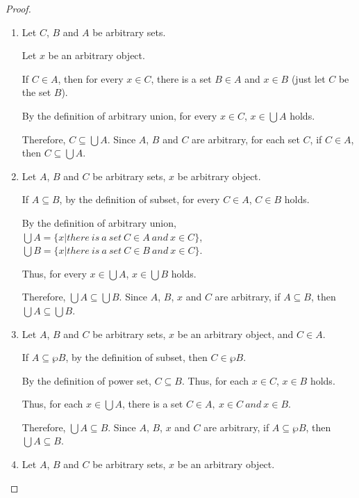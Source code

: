 \documentclass[12pt,a4paper,utf8]{article}
\theoremstyle{plain}
\begin{document}
\begin{proof}\ 
\begin{enumerate}

    \item 
    Let $C$, $B$ and $A$ be arbitrary sets. 
    
    Let $x$ be an arbitrary object. 
    
    If $C \in A$, then for every $x \in C$, there is a set $B \in A$ and $x \in B$ (just let $C$ be the set $B$). 
    
    By the definition of arbitrary union, for every $x \in C$, $x \in \bigcup A$ holds. 
    
    Therefore, $C \subseteq \bigcup A$. Since $A$, $B$ and $C$ are arbitrary, for each set $C$, if $C \in A$, then $C \subseteq \bigcup A$.
    
    \item 
    Let $A$, $B$ and $C$ be arbitrary sets, $x$ be arbitrary object. 
    
    If $A \subseteq B$, by the definition of subset, for every $C \in A$, $C \in B$ holds. 
    
    By the definition of arbitrary union, $\bigcup A=\{x \vert there\ is\ a\ set\ C \in A\ and\ x \in C \} $, $\bigcup B=\{x \vert there\ is\ a\ set\ C \in B\ and\ x \in C \} $.
    
    Thus, for every $x \in \bigcup A$, $x \in \bigcup B$ holds. 
    
    Therefore, $\bigcup A \subseteq \bigcup B$. Since $A$, $B$, $x$ and $C$ are arbitrary, if $A \subseteq B$, then $\bigcup A \subseteq \bigcup B$.
    
    \item 
    Let $A$, $B$ and $C$ be arbitrary sets, $x$ be an arbitrary object, and $C \in A$. 
    
    If $A \subseteq \wp B$, by the definition of subset, then $C \in \wp B$. 
    
    By the definition of power set, $C \subseteq B$. Thus, for each $x \in C$, $x \in B$ holds. 
    
    Thus, for each $x \in \bigcup A$, there is a set $C \in A ,\ x \in C\ and\ x \in B$. 
    
    Therefore, $\bigcup A \subseteq B$. Since $A$, $B$, $x$ and $C$ are arbitrary, if $A \subseteq \wp B$, then $\bigcup A \subseteq B$.
    
    \item 
    Let $A$, $B$ and $C$ be arbitrary sets, $x$ be an arbitrary object. 
    

\end{enumerate}
\end{proof}
\end{document}
